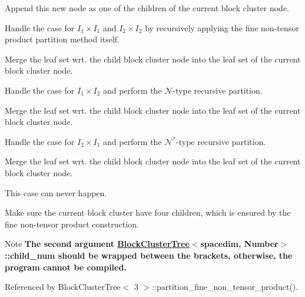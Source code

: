 Append this new node as one of the children of the current block cluster node.

Handle the case for $I_1 \times I_1$ and $I_2 \times I_2$ by recursively applying the fine non-\/tensor product partition method itself.

Merge the leaf set wrt. the child block cluster node into the leaf set of the current block cluster node.

Handle the case for $I_1 \times I_2$ and perform the $\mathcal{N}$-\/type recursive partition.

Merge the leaf set wrt. the child block cluster node into the leaf set of the current block cluster node.

Handle the case for $I_2 \times I_1$ and perform the $\mathcal{N}^*$-\/type recursive partition.

Merge the leaf set wrt. the child block cluster node into the leaf set of the current block cluster node.

This case can never happen.

Make sure the current block cluster have four children, which is ensured by the fine non-\/tensor product construction.


\begin{DoxyDescription}
\item[Note ]{\bfseries The second argument {\ttfamily \hyperlink{classBlockClusterTree}{Block\+Cluster\+Tree}$<$spacedim}, Number$>$\+::child\+\_\+num should be wrapped between the brackets, otherwise, the program cannot be compiled.} 
\end{DoxyDescription}

Referenced by Block\+Cluster\+Tree$<$ 3 $>$\+::partition\+\_\+fine\+\_\+non\+\_\+tensor\+\_\+product().

\mbox{\label{classBlockClusterTree_aafad0fae48bf7c462e8e943b76893fc0}} 
